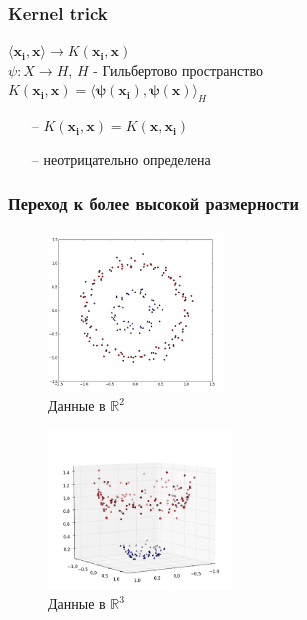 \documentclass[12pt]{beamer}
\begin{document}
\begin{frame}\frametitle{Kernel trick}
$\langle \mathbf{x_i}, \mathbf{x} \rangle \rightarrow K(\mathbf{x_i}, \mathbf{x})$\\
\vspace{5mm}
$\psi: X \rightarrow H$, $H$ - Гильбертово пространство\\
$K(\mathbf{x_i}, \mathbf{x}) = \langle \mathbf{\psi(x_i)}, \mathbf{\psi(x)} \rangle_H$
\begin{itemize}
\item[--] $K(\mathbf{x_i}, \mathbf{x}) = K(\mathbf{x}, \mathbf{x_i})$
\item[--] неотрицательно определена
\end{itemize}
\end{frame}

\begin{frame}\frametitle{Переход к более высокой размерности}
\begin{figure}[htbp]
	\begin{minipage}{.5\textwidth}
	  \includegraphics[height=120pt, keepaspectratio = true]{images/data-r2} \\
		\centering Данные в $\mathbb{R}^2$
    \end{minipage}%
    \begin{minipage}{.5\textwidth}
		\includegraphics[height=120pt, keepaspectratio = true]{images/data-r3}   \\
		\centering Данные в $\mathbb{R}^3$
	\end{minipage}%

\end{figure}
\end{frame}
\end{document}
